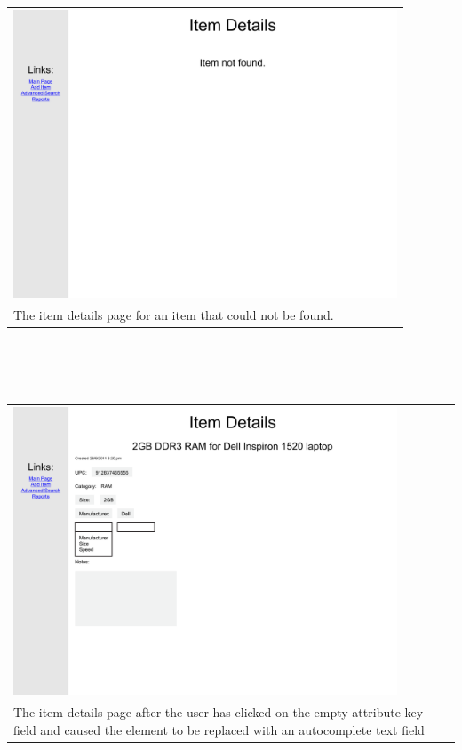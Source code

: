 \documentclass{article}
\begin{document}
\begin{tabular}{ p{4.5in} }
\includegraphics[keepaspectratio, width=4.5in]{viewDetailsF1S1.pdf} \\
The item details page for an item that could not be found.
\end{tabular}\\
~\\
~\\
\begin{tabular}{ p{4.5in} }
\includegraphics[keepaspectratio, width=4.5in]{modifyDetailsF0S1.pdf} \\
The item details page after the user has clicked on the empty attribute key field and caused the element to be replaced with an autocomplete text field
\end{tabular}\\
~\\
~\\
\end{document}
